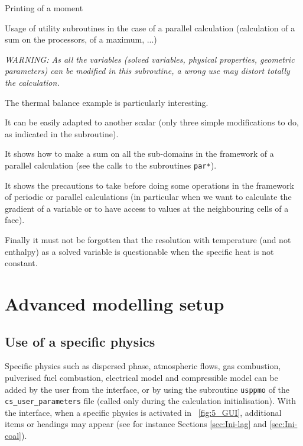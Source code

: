 {{{\begin{list}{-}{}
\item Printing of a moment

\item Usage of utility
      subroutines in the case of a parallel calculation
      (calculation of a sum on the processors, of a maximum, ...)
\end{list}

{\em WARNING: As all the variables (solved variables, physical
properties, geometric parameters) can be modified in this subroutine, a
wrong use may distort totally the calculation.}

The thermal balance example is particularly interesting.
\begin{list}{-}{}
\item It can be easily adapted to another scalar (only three simple
      modifications to do, as indicated in the subroutine).
\item It shows how to make a sum on all the sub-domains in the framework
      of a parallel calculation (see the calls to the subroutines
      \texttt{par*}).
\item It shows the precautions to take before doing some operations in
      the framework of periodic or parallel calculations (in particular
      when we want to calculate the gradient of a variable or to have
      access to values at the neighbouring cells of a face).
\item Finally it must not be forgotten that the resolution with
      temperature (and not enthalpy) as a solved variable is questionable when the specific
      heat is not constant.
\end{list}

\section{Advanced modelling setup}

\subsection{Use of a specific physics}
\label{sec:prg_usppmo}%
Specific physics such as dispersed phase, atmospheric flows, gas combustion,
pulverised fuel combustion, electrical model and compressible model can be
added by the user from the interface, or by using the subroutine \texttt{usppmo} of
the \texttt{cs\_user\_parameters} file (called only during the calculation initialisation).
With the interface, when a specific physics is activated in \figurename~\ref{fig:5_GUI},
additional items or headings may appear (see for instance Sections \ref{sec:Ini-lag}
and \ref{sec:Ini-coal}).

}}}
